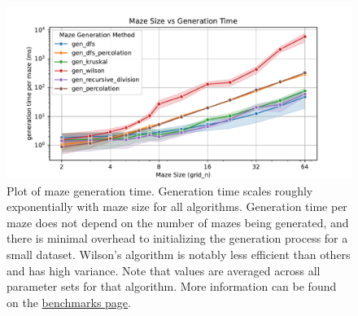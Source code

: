 \begin{figure}
	\hypertarget{fig:benchmarks}{%
		\centering
		\includegraphics[width=\textwidth]{figures/benchmarks/gridsize-vs-gentime.pdf}
		\caption{
			Plot of maze generation time. Generation time scales
			roughly exponentially with maze size for all algorithms. Generation time per
			maze does not depend on the number of mazes being generated, and there
			is minimal overhead to initializing the generation process for a small
			dataset. Wilson's algorithm is notably less efficient than others and
			has high variance. Note that values are averaged across all parameter
			sets for that algorithm. More information can be found on the
			\href{https://understanding-search.github.io/maze-dataset/benchmarks/}{benchmarks page}.
		}
		\label{fig:benchmarks}
	}
\end{figure}